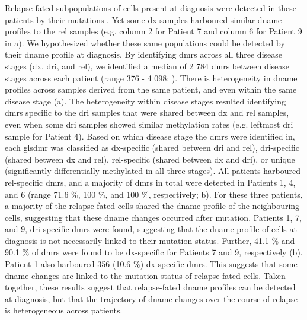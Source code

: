 Relapse-fated subpopulations of cells present at diagnosis were detected in these patients by their mutations \cite{dobsonRelapseFatedLatentDiagnosis2020}.
Yet some \gls{dx} samples harboured similar \gls{dname} profiles to the \gls{rel} samples (e.g. column 2 for Patient 7 and column 6 for Patient 9 in a).
We hypothesized whether these same populations could be detected by their \gls{dname} profile at diagnosis.
By identifying \glspl{dmr} across all three disease stages (\gls{dx}, \gls{dri}, and \gls{rel}), we identified a median of 2 784 \glspl{dmr} between disease stages across each patient (range 376 - 4 098; ).
There is heterogeneity in \gls{dname} profiles across samples derived from the same patient, and even within the same disease stage (a).
The heterogeneity within disease stages resulted identifying \glspl{dmr} specific to the \gls{dri} samples that were shared between \gls{dx} and \gls{rel} samples, even when some \gls{dri} samples showed similar methylation rates (e.g. leftmost \gls{dri} sample for Patient 4).
Based on which disease stage the \glspl{dmr} were identified in, each gls{dmr} was classified as \gls{dx}-specific (shared between \gls{dri} and \gls{rel}), \gls{dri}-specific (shared between \gls{dx} and \gls{rel}), \gls{rel}-specific (shared between \gls{dx} and \gls{dri}), or unique (significantly differentially methylated in all three stages).
All patients harboured \gls{rel}-specific \glspl{dmr}, and a majority of \glspl{dmr} in total were detected in Patients 1, 4, and 6 (range 71.6 \%, 100 \%, and 100 \%, respectively; b).
For these three patients, a majority of the relapse-fated cells shared the \gls{dname} profile of the neighbouring cells, suggesting that these \gls{dname} changes occurred after mutation.
Patients 1, 7, and 9, \gls{dri}-specific \glspl{dmr} were found, suggesting that the \gls{dname} profile of cells at diagnosis is not necessarily linked to their mutation status.
Further, 41.1 \% and 90.1 \% of \glspl{dmr} were found to be \gls{dx}-specific for Patients 7 and 9, respectively (b).
Patient 1 also harboured 356 (10.6 \%) \gls{dx}-specific \glspl{dmr}.
This suggests that some \gls{dname} changes are linked to the mutation status of relapse-fated cells.
Taken together, these results suggest that relapse-fated \gls{dname} profiles can be detected at diagnosis, but that the trajectory of \gls{dname} changes over the course of relapse is heterogeneous across patients.

